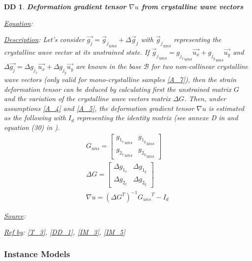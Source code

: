 \documentclass[12pt]{article}
\newtheorem{DD}{DD}
\begin{document}
\begin{DD}
\label{DD_3}
\noindent\colorbox{shadecolorDD}{\normalfont \textbf{Deformation gradient tensor $\nabla u$ from crystalline wave vectors}}
\normalfont
\item \underline{Equation}: 
\item \underline{Description}: Let's consider $\overrightarrow{g_j} = {\overrightarrow{g}_{j}}_{uns} + \Delta \overrightarrow{g}_j$ with ${\overrightarrow{g}_{j}}_{uns}$ representing the crystalline wave vector at its unstrained state. If ${\overrightarrow{g}_{j}}_{uns}={g_{j_{x}}}_{uns}\overrightarrow{u_{x}}+{g_{j_{y}}}_{uns}\overrightarrow{u_{y}}$ and $\Delta \overrightarrow{g_{j}}=\Delta g_{j_{x}}\overrightarrow{u_{x}}+\Delta g_{j_{y}}\overrightarrow{u_{y}}$ are known in the base $\mathcal{B}$ for two non-collinear crystalline wave vectors (only valid for mono-crystalline samples \cref{A_7}), then the strain deformation tensor can be deduced by calculating first the unstrained matrix $G$ and the variation of the crystalline wave vectors matrix $\Delta G$. Then, under assumptions \cref{A_4} and \cref{A_5}, the deformation gradient tensor $\nabla u$ is estimated as the following with $I_{d}$ representing the identity matrix (see annexe D in \cite{Hytch1998} and equation (30) in \cite{Rouviere2005}). 
\begin{equation}
\begin{gathered}
	G_{uns} =
	\begin{bmatrix}
	{g_{1_{x}}}_{uns} & {g_{1_{y}}}_{uns} \\
	{g_{2_{x}}}_{uns} & {g_{2_{y}}}_{uns} 
	\end{bmatrix} \\
	\Delta G =
	\begin{bmatrix}
	\Delta g_{1_{x}} & \Delta g_{1_{y}} \\
	\Delta g_{2_{x}} & \Delta g_{2_{y}} 
	\end{bmatrix} \\
\nabla u = ({\Delta G}^{T})^{-1}{G_{uns}}^{T}-I_{d}
\end{gathered}
\label{eq:strain_1}
\end{equation}
\item \underline{Source}: \cite{Hytch1998,Rouviere2005}
\item \underline{Ref by}: \cref{T_3}, \cref{DD_1}, \cref{IM_3}, \cref{IM_5}
\end{DD}

\subsubsection{Instance Models} \label{sec_instance}    
\end{document}
